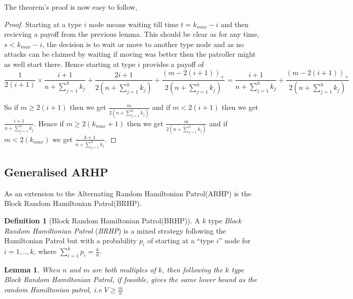 \documentclass[a4paper,10pt]{article}
\newcommand{\denominator}{\ensuremath{n+\sum\limits_{j=1}^{h} k_{j}}}
\newcommand{\pospart}[1]{\left( #1 \right)_{+}}
\newtheorem{lemma}[theorem]{Lemma}
\theoremstyle{definition}
\newtheorem{definition}[theorem]{Definition}
\theoremstyle{definition}
\theoremstyle{remark}
\theoremstyle{definition}
\begin{document}
The theorem's proof is now easy to follow,

\begin{proof}
Starting at a type $i$ node means waiting till time $t=k_{max}-i$ and then recieving a payoff from the previous lemma. This should be clear as for any time, $s < k_{max}-i$, the decision is to wait or move to another type node and as no attacks can be claimed by waiting if moving was better then the patroller might as well start there.
Hence starting at type $i$ provides a payoff of
$$\frac{1}{2(i+1)} \times \frac{i+1}{\denominator} + \frac{2i+1}{2 \left( \denominator \right)} +\frac{\pospart{m-2(i+1)}}{2 \left( \denominator \right)}=\frac{i+1}{\denominator} +\frac{\pospart{m-2(i+1)}}{2 \left( \denominator \right)}$$

So if $m \geq 2(i+1)$ then we get $\frac{m}{2 \left( \denominator \right)}$ and if $m < 2(i+1)$ then we get $\frac{i+1}{\denominator}$. 
Hence if $m \geq 2(k_{max}+1)$ then we get $\frac{m}{2 \left( \denominator \right)}$ and if $m < 2(k_{max})$ we get $\frac{k+1}{\denominator}$.
\end{proof}

\subsection{Generalised ARHP}
\label{Appendix:Generalised ARHP}

As an extension to the Alternating Random Hamiltonian Patrol(ARHP) is the Block Random Hamiltonian Patrol(BRHP).

\begin{definition}[Block Random Hamiltonian Patrol(BRHP)]
A $k$ type \textit{Block Random Hamiltonian Patrol} (\textit{BRHP}) is a mixed strategy following the Hamiltonian Patrol but with a probability $p_{i}$ of starting at a ``type $i$'' node for $i=1,..,k$, where $\sum\limits_{i=1}^{k} p_{i}=\frac{k}{n}$.
\end{definition}

\begin{lemma}
When $n$ and $m$ are both multiples of $k$, then following the $k$ type Block Random Hamiltonian Patrol, if feasible, gives the same lower bound as the random Hamiltonian patrol, i.e $V \geq \frac{m}{n}$
\end{lemma}
\end{document}
